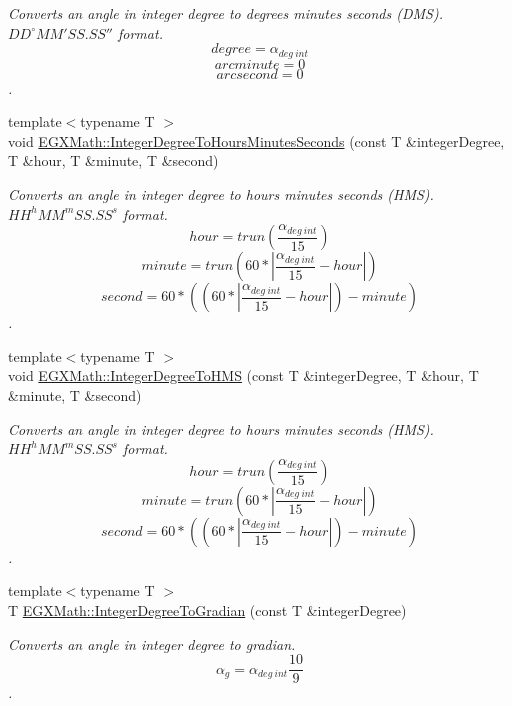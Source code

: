 \begin{DoxyCompactItemize}
\begin{DoxyCompactList}\small\item\em Converts an angle in integer degree to degrees minutes seconds (D\+MS). ${DD}^{\circ}{MM}'{SS.SS}''$ format. \[degree=\alpha_{deg\ int}\] \[arcminute= 0\] \[arcsecond= 0\]. \end{DoxyCompactList}\item 
{\footnotesize template$<$typename T $>$ }\\void \mbox{\hyperlink{group___e_g_x_math-_conversions-_angle_conversions-_integer_degree_gaaac96728b305fd8ed024843f4e92fd08}{E\+G\+X\+Math\+::\+Integer\+Degree\+To\+Hours\+Minutes\+Seconds}} (const T \&integer\+Degree, T \&hour, T \&minute, T \&second)
\begin{DoxyCompactList}\small\item\em Converts an angle in integer degree to hours minutes seconds (H\+MS). ${HH}^{h}{MM}^{m}{SS.SS}^{s}$ format. \[hour=trun(\frac{\alpha_{deg\ int}}{15})\] \[minute=trun(60 * |\frac{\alpha_{deg\ int}}{15} - hour|)\] \[second=60 * ((60 * |\frac{\alpha_{deg\ int}}{15} - hour|)-minute)\]. \end{DoxyCompactList}\item 
{\footnotesize template$<$typename T $>$ }\\void \mbox{\hyperlink{group___e_g_x_math-_conversions-_angle_conversions-_integer_degree_gae6b79bd5a92f8c6942b9fc2c50695e6a}{E\+G\+X\+Math\+::\+Integer\+Degree\+To\+H\+MS}} (const T \&integer\+Degree, T \&hour, T \&minute, T \&second)
\begin{DoxyCompactList}\small\item\em Converts an angle in integer degree to hours minutes seconds (H\+MS). ${HH}^{h}{MM}^{m}{SS.SS}^{s}$ format. \[hour=trun(\frac{\alpha_{deg\ int}}{15})\] \[minute=trun(60 * |\frac{\alpha_{deg\ int}}{15} - hour|)\] \[second=60 * ((60 * |\frac{\alpha_{deg\ int}}{15} - hour|)-minute)\]. \end{DoxyCompactList}\item 
{\footnotesize template$<$typename T $>$ }\\T \mbox{\hyperlink{group___e_g_x_math-_conversions-_angle_conversions-_integer_degree_ga47127467ff7a8ef57f6be9ce496a97df}{E\+G\+X\+Math\+::\+Integer\+Degree\+To\+Gradian}} (const T \&integer\+Degree)
\begin{DoxyCompactList}\small\item\em Converts an angle in integer degree to gradian. \[\alpha_{g}=\alpha_{deg\ int}\frac{10}{9}\]. \end{DoxyCompactList}\item 

\end{DoxyCompactItemize}
